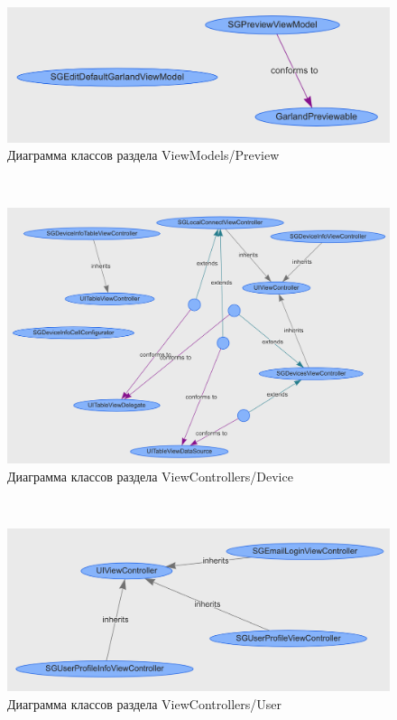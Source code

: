 ~
\begin{figure}[H]
\centering
	\includegraphics[scale=0.5]{figures/diagrams/class/preview.png}
	\caption{Диаграмма классов раздела ViewModels/Preview}
	\label{fig:appendices:classDiagram:preview}
\end{figure}
~
\begin{figure}[H]
\centering
	\includegraphics[scale=0.5]{figures/diagrams/class/vc_device.png}
	\caption{Диаграмма классов раздела ViewControllers/Device}
	\label{fig:appendices:classDiagram:vc_device}
\end{figure}
~
\begin{figure}[H]
\centering
	\includegraphics[scale=0.5]{figures/diagrams/class/vc_user.png}
	\caption{Диаграмма классов раздела ViewControllers/User}
	\label{fig:appendices:classDiagram:vc_user}
\end{figure}
